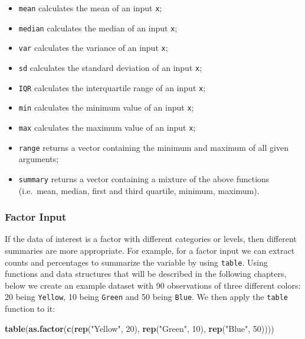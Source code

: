 \documentclass[12pt,]{krantz}
\newenvironment{Shaded}{\begin{snugshade}}{\end{snugshade}}
\newcommand{\KeywordTok}[1]{\textcolor[rgb]{0.27,0.27,0.27}{\textbf{#1}}}
\newcommand{\DecValTok}[1]{\textcolor[rgb]{0.06,0.06,0.06}{#1}}
\newcommand{\StringTok}[1]{\textcolor[rgb]{0.5,0.5,0.5}{#1}}
\newcommand{\NormalTok}[1]{#1}
\providecommand{\tightlist}{%
  \setlength{\itemsep}{0pt}\setlength{\parskip}{0pt}}
\begin{document}
\begin{itemize}
\tightlist
\item
  \texttt{mean} calculates the mean of an input \texttt{x};
\item
  \texttt{median} calculates the median of an input \texttt{x};
\item
  \texttt{var} calculates the variance of an input \texttt{x};
\item
  \texttt{sd} calculates the standard deviation of an input \texttt{x};
\item
  \texttt{IQR} calculates the interquartile range of an input
  \texttt{x};
\item
  \texttt{min} calculates the minimum value of an input \texttt{x};
\item
  \texttt{max} calculates the maximum value of an input \texttt{x};
\item
  \texttt{range} returns a vector containing the minimum and maximum of
  all given arguments;
\item
  \texttt{summary} returns a vector containing a mixture of the above
  functions (i.e.~mean, median, first and third quartile, minimum,
  maximum).
\end{itemize}

\subsubsection{Factor Input}\label{factor-input}

If the data of interest is a factor with different categories or levels,
then different summaries are more appropriate. For example, for a factor
input we can extract counts and percentages to summarize the variable by
using \texttt{table}. Using functions and data structures that will be
described in the following chapters, below we create an example dataset
with 90 observations of three different colors: 20 being
\texttt{Yellow}, 10 being \texttt{Green} and 50 being \texttt{Blue}. We
then apply the \texttt{table} function to it:

\begin{Shaded}
\begin{Highlighting}[]
\KeywordTok{table}\NormalTok{(}\KeywordTok{as.factor}\NormalTok{(}\KeywordTok{c}\NormalTok{(}\KeywordTok{rep}\NormalTok{(}\StringTok{"Yellow"}\NormalTok{, }\DecValTok{20}\NormalTok{), }\KeywordTok{rep}\NormalTok{(}\StringTok{"Green"}\NormalTok{, }\DecValTok{10}\NormalTok{), }\KeywordTok{rep}\NormalTok{(}\StringTok{"Blue"}\NormalTok{, }\DecValTok{50}\NormalTok{))))}
\end{Highlighting}
\end{Shaded}
\end{document}
